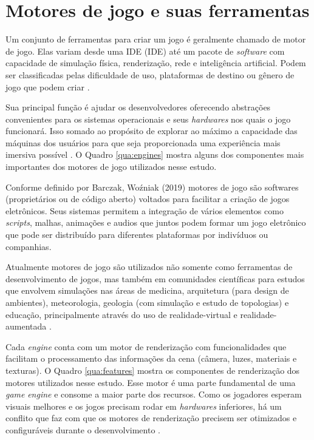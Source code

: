 \section{Motores de jogo e suas ferramentas}
\label{sec:motores-jogo-ferramentas}

Um conjunto de ferramentas para criar um jogo é geralmente chamado de motor de jogo. Elas variam desde uma IDE (\acrlong{IDE}) até um pacote de \textit{software} com capacidade de simulação física, renderização, rede e inteligência artificial. Podem ser classificadas pelas dificuldade de uso, plataformas de destino ou gênero de jogo que podem criar \cite{compGameLang}. 

Sua principal função é ajudar os desenvolvedores oferecendo abstrações convenientes para os sistemas operacionais e seus \textit{hardwares} nos quais o jogo funcionará. Isso somado ao propósito de explorar ao máximo a capacidade das máquinas dos usuários para que seja proporcionada uma experiência mais imersiva possível \cite{simon2015unity}. O Quadro \ref{qua:engines} mostra alguns dos componentes mais importantes dos motores de jogo utilizados nesse estudo.



Conforme definido por Barczak, Woźniak (2019) motores de jogo são softwares (proprietários ou de código aberto) voltados para facilitar a criação de jogos eletrônicos. Seus sistemas permitem a integração de vários elementos como \textit{\Gls{scripts}}, malhas, animações e audios que juntos podem formar um jogo eletrônico que pode ser distribuído para diferentes plataformas por indivíduos ou companhias. 

Atualmente motores de jogo são utilizados não somente como ferramentas de desenvolvimento de jogos, mas também em comunidades científicas para estudos que envolvem simulações nas áreas de medicina, arquitetura (para design de ambientes), meteorologia, geologia (com simulação e estudo de topologias) e educação, principalmente através do uso de \Gls{realidade-virtual} e \Gls{realidade-aumentada} \cite{comparacaoDesempenho2}. 

Cada \textit{engine} conta com um motor de renderização com funcionalidades que facilitam o processamento das informações da cena (câmera, luzes, materiais e texturas). O Quadro \ref{qua:features} mostra os componentes de renderização dos motores utilizados nesse estudo. Esse motor é uma parte fundamental de uma \textit{game} \textit{engine} e consome a maior parte dos recursos. Como os jogadores esperam visuais melhores e os jogos precisam rodar em \textit{hardwares} inferiores, há um conflito que faz com que os motores de renderização precisem ser otimizados e configuráveis durante o desenvolvimento \cite{vsmid2017comparison}.

